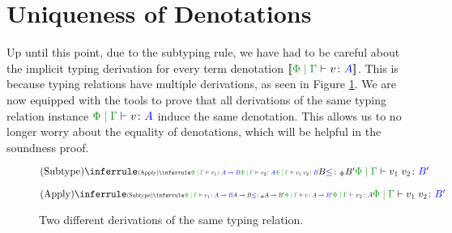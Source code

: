 \section{Uniqueness of Denotations}\label{UniqueDenotations}

Up until this point, due to the subtyping rule, we have had to be careful about the implicit typing derivation for every term denotation $\deno{\gpetyperelation{v}{A}}$. This is because typing relations have multiple derivations, as seen in Figure \ref{NonUniqueDerivations}. We are now equipped with the tools to prove that all derivations of the same typing relation instance $\gpetyperelation{v}{A}$ induce the same denotation. This allows us to no longer worry about the equality of denotations, which will be helpful in the soundness proof.


\begin{figure}[H]
\begin{framed}
        \centering
            \begin{minipage}{0.47\linewidth}
                \centering
                \begin{equation*}
                    \scalebox{.9}{$                    \ntreeruleII{\vsubtype}{
                        \scalebox{.6}{$
                        \ntreeruleII{\vapply}{\gpetyperelation{v_1}{\ab}}{\gpetyperelation{v_2}{A}}{\gpetyperelation{\apply{v_1}{v_2}}{B}}
                        $}
                    }{
                        \scalebox{.9}{$B\subtypep B'$}
                    }{
                        \gpetyperelation{\apply{v_1}{v_2}}{B'}
                    }
                    $}
                \end{equation*}
            \end{minipage}
            \quad
            \begin{minipage}{0.47\linewidth}
                \centering

                \begin{equation*}
                    \scalebox{.9}{$
                    \ntreeruleII{\vapply}{
                        \scalebox{.6}{$
                        \ntreeruleII{\vsubtype}{\gpetyperelation{v_1}{\ab}}{\ab\subtypep \fntype{A}{B'}}{\gpetyperelation{v}{\fntype{A}{B'}}}
                        $}
                    }{
                        \scalebox{.7}{$\gpetyperelation{v_2}{A}$}
                    }{
                        \gpetyperelation{\apply{v_1}{v_2}}{B'}
                    }$}
                \end{equation*}
            \end{minipage}
\end{framed}
    \caption{Two different derivations of the same typing relation.}
    \label{NonUniqueDerivations}
\end{figure}

